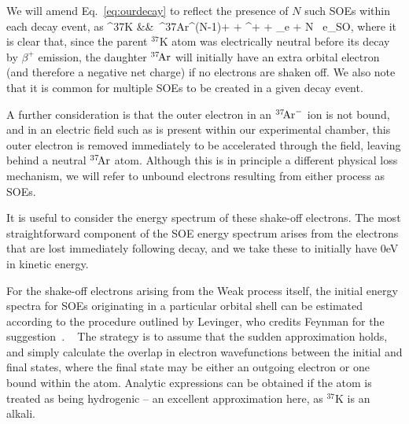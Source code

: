 We will amend Eq.~\ref{eq:ourdecay} to reflect the presence of $N$ such \ac{SOE}s within each decay event, as
\bea
^{37}\textrm{K} &\rightarrow& \,^{37}\textrm{\!Ar}^{(N-1)+} + \beta^{+} + \nu_e + N \, e_{\textrm{SO}}, 
\label{eq:ourdecay_withsoe}
\eea
where it is clear that, since the parent $^{37}\textrm{K}$ atom was electrically neutral before its decay by $\beta^+$ emission, the daughter $^{37}\textrm{\!Ar}$ will initially have an extra
orbital electron (and therefore a negative net charge) if no electrons are shaken off.  We also note that it is common for multiple SOEs to be created in a given decay event.  

A further consideration is that the outer electron in an $^{37}\textrm{\!Ar}^{-}$ ion is not bound\cite{ArgonMinusIons}, and in an electric field such as is present within our experimental chamber, this outer electron is removed immediately to be accelerated through the field, leaving behind a neutral $^{37}\textrm{\!Ar}$ atom.  Although this is in principle a different physical loss mechanism, we will refer to unbound electrons resulting from either process as SOEs.  

It is useful to consider the energy spectrum of these shake-off electrons.  The most straightforward component of the SOE energy spectrum arises from the electrons that are lost immediately following decay, and we take these to initially have 0eV in kinetic energy.  

For the shake-off electrons arising from the Weak process itself, the initial energy spectra for SOEs originating in a particular orbital shell can be estimated according to the procedure outlined by Levinger, who credits Feynman for the suggestion~\cite{Levinger}.
~  \noindent
The strategy is to assume that the sudden approximation holds, and simply calculate the overlap in electron wavefunctions between the initial and final states, where the final state may be either an outgoing electron or one bound within the atom.  Analytic expressions can be obtained if the atom is treated as being hydrogenic -- an excellent approximation here, as $^{37}\textrm{K}$ is an alkali.  

